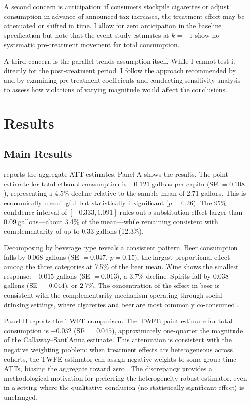 \documentclass[12pt]{article}
\begin{document}
A second concern is anticipation: if consumers stockpile cigarettes or adjust consumption in advance of announced tax increases, the treatment effect may be attenuated or shifted in time. I allow for zero anticipation in the baseline specification but note that the event study estimates at $k = -1$ show no systematic pre-treatment movement for total consumption.

A third concern is the parallel trends assumption itself. While I cannot test it directly for the post-treatment period, I follow the approach recommended by \citet{roth2022pretest} and \citet{rambachan2023more} by examining pre-treatment coefficients and conducting sensitivity analysis to assess how violations of varying magnitude would affect the conclusions.


\section{Results}
\label{sec:results}

\subsection{Main Results}

 reports the aggregate ATT estimates. Panel A shows the \citet{callaway2021difference} results. The point estimate for total ethanol consumption is $-0.121$ gallons per capita (SE $= 0.108$), representing a 4.5\% decline relative to the sample mean of 2.71 gallons. This is economically meaningful but statistically insignificant ($p = 0.26$). The 95\% confidence interval of $[-0.333, 0.091]$ rules out a substitution effect larger than 0.09 gallons---about 3.4\% of the mean---while remaining consistent with complementarity of up to 0.33 gallons (12.3\%).

Decomposing by beverage type reveals a consistent pattern. Beer consumption falls by 0.068 gallons (SE $= 0.047$, $p = 0.15$), the largest proportional effect among the three categories at 7.5\% of the beer mean. Wine shows the smallest response: $-0.015$ gallons (SE $= 0.013$), a 3.7\% decline. Spirits fall by 0.038 gallons (SE $= 0.044$), or 2.7\%. The concentration of the effect in beer is consistent with the complementarity mechanism operating through social drinking settings, where cigarettes and beer are most commonly co-consumed \citep{cotti2016alcohol}.

Panel B reports the TWFE comparison. The TWFE point estimate for total consumption is $-0.032$ (SE $= 0.045$), approximately one-quarter the magnitude of the Callaway--Sant'Anna estimate. This attenuation is consistent with the negative weighting problem: when treatment effects are heterogeneous across cohorts, the TWFE estimator can assign negative weights to some group-time ATTs, biasing the aggregate toward zero \citep{goodman2021difference}. The discrepancy provides a methodological motivation for preferring the heterogeneity-robust estimator, even in a setting where the qualitative conclusion (no statistically significant effect) is unchanged.
\end{document}
